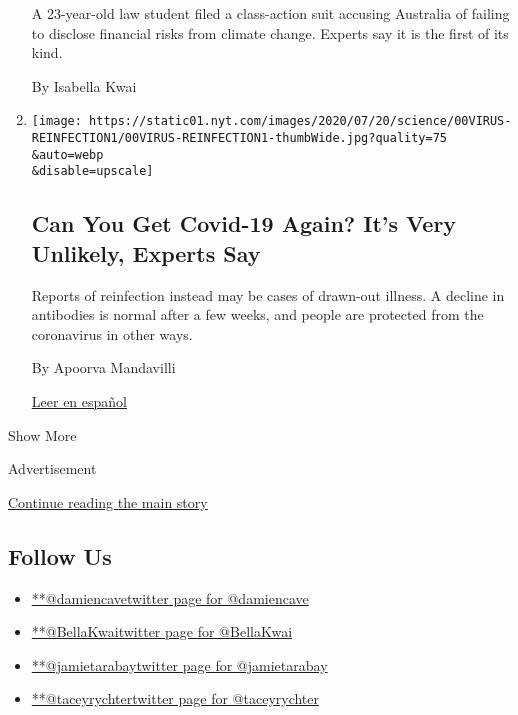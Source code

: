 \begin{enumerate}
  A 23-year-old law student filed a class-action suit accusing Australia
  of failing to disclose financial risks from climate change. Experts
  say it is the first of its kind.

  By Isabella Kwai
\item
  \href{/2020/07/22/health/covid-antibodies-herd-immunity.html}{}

  \texttt{[image: https://static01.nyt.com/images/2020/07/20/science/00VIRUS-REINFECTION1/00VIRUS-REINFECTION1-thumbWide.jpg?quality=75\\\&auto=webp\\\&disable=upscale]}

  \hypertarget{can-you-get-covid-19-again-its-very-unlikely-experts-say}{%
  \subsection{Can You Get Covid-19 Again? It's Very Unlikely, Experts
  Say}\label{can-you-get-covid-19-again-its-very-unlikely-experts-say}}

  Reports of reinfection instead may be cases of drawn-out illness. A
  decline in antibodies is normal after a few weeks, and people are
  protected from the coronavirus in other ways.

  By Apoorva Mandavilli

  \href{https://www.nytimes.com/es/2020/07/24/espanol/ciencia-y-tecnologia/reinfeccion-coronavirus.html}{Leer
  en español}
\end{enumerate}

Show More

Advertisement

\protect\hyperlink{after-mid1}{Continue reading the main story}

\hypertarget{follow-us}{%
\subsection{Follow Us}\label{follow-us}}

\begin{itemize}
\tightlist
\item
  \href{https://twitter.com/damiencave}{**@damiencavetwitter page for
  @damiencave}
\item
  \href{https://twitter.com/BellaKwai}{**@BellaKwaitwitter page for
  @BellaKwai}
\item
  \href{https://twitter.com/jamietarabay}{**@jamietarabaytwitter page
  for @jamietarabay}
\item
  \href{https://twitter.com/taceyrychter}{**@taceyrychtertwitter page
  for @taceyrychter}
\end{itemize}

